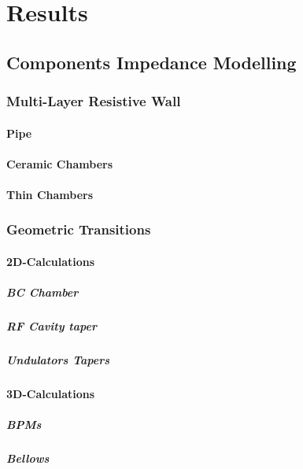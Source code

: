 \documentclass[
	12pt,				%
	openright,			%
	oneside,			%
	a4paper,		%
	chapter=TITLE,		%
	section=TITLE,		%
    brazil,				%
	english,			%
	sumario=tradicional,
	]{abntex2}
\begin{document}
\chapter{Results}
  \section{Components Impedance Modelling}
    \subsection{Multi-Layer Resistive Wall}
      \subsubsection{Pipe}
      \subsubsection{Ceramic Chambers}
      \subsubsection{Thin Chambers}
    \subsection{Geometric Transitions}
      \subsubsection{2D-Calculations}
        \paragraph{BC Chamber}
        \paragraph{RF Cavity taper}
        \paragraph{Undulators Tapers}
      \subsubsection{3D-Calculations}
        \paragraph{BPMs}
        \paragraph{Bellows}
\end{document}

